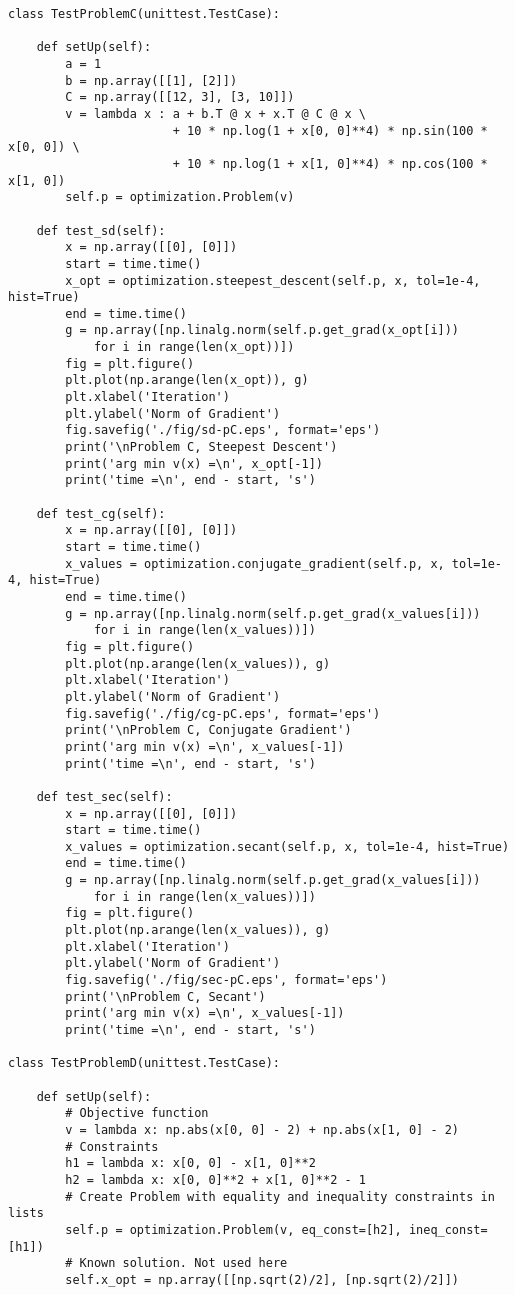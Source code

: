 \begin{lstlisting}
class TestProblemC(unittest.TestCase):

    def setUp(self):
        a = 1
        b = np.array([[1], [2]])
        C = np.array([[12, 3], [3, 10]])
        v = lambda x : a + b.T @ x + x.T @ C @ x \
                       + 10 * np.log(1 + x[0, 0]**4) * np.sin(100 * x[0, 0]) \
                       + 10 * np.log(1 + x[1, 0]**4) * np.cos(100 * x[1, 0])
        self.p = optimization.Problem(v)

    def test_sd(self):
        x = np.array([[0], [0]])
        start = time.time()
        x_opt = optimization.steepest_descent(self.p, x, tol=1e-4, hist=True)
        end = time.time()
        g = np.array([np.linalg.norm(self.p.get_grad(x_opt[i]))
            for i in range(len(x_opt))])
        fig = plt.figure()
        plt.plot(np.arange(len(x_opt)), g)
        plt.xlabel('Iteration')
        plt.ylabel('Norm of Gradient')
        fig.savefig('./fig/sd-pC.eps', format='eps')
        print('\nProblem C, Steepest Descent')
        print('arg min v(x) =\n', x_opt[-1])
        print('time =\n', end - start, 's')

    def test_cg(self):
        x = np.array([[0], [0]])
        start = time.time()
        x_values = optimization.conjugate_gradient(self.p, x, tol=1e-4, hist=True)
        end = time.time()
        g = np.array([np.linalg.norm(self.p.get_grad(x_values[i]))
            for i in range(len(x_values))])
        fig = plt.figure()
        plt.plot(np.arange(len(x_values)), g)
        plt.xlabel('Iteration')
        plt.ylabel('Norm of Gradient')
        fig.savefig('./fig/cg-pC.eps', format='eps')
        print('\nProblem C, Conjugate Gradient')
        print('arg min v(x) =\n', x_values[-1])
        print('time =\n', end - start, 's')

    def test_sec(self):
        x = np.array([[0], [0]])
        start = time.time()
        x_values = optimization.secant(self.p, x, tol=1e-4, hist=True)
        end = time.time()
        g = np.array([np.linalg.norm(self.p.get_grad(x_values[i]))
            for i in range(len(x_values))])
        fig = plt.figure()
        plt.plot(np.arange(len(x_values)), g)
        plt.xlabel('Iteration')
        plt.ylabel('Norm of Gradient')
        fig.savefig('./fig/sec-pC.eps', format='eps')
        print('\nProblem C, Secant')
        print('arg min v(x) =\n', x_values[-1])
        print('time =\n', end - start, 's')

class TestProblemD(unittest.TestCase):

    def setUp(self):
        # Objective function
        v = lambda x: np.abs(x[0, 0] - 2) + np.abs(x[1, 0] - 2)
        # Constraints
        h1 = lambda x: x[0, 0] - x[1, 0]**2
        h2 = lambda x: x[0, 0]**2 + x[1, 0]**2 - 1
        # Create Problem with equality and inequality constraints in lists
        self.p = optimization.Problem(v, eq_const=[h2], ineq_const=[h1])
        # Known solution. Not used here
        self.x_opt = np.array([[np.sqrt(2)/2], [np.sqrt(2)/2]])


\end{lstlisting}
